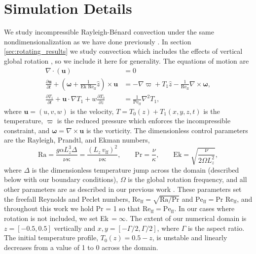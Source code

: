 \documentclass[aps, pre, onecolumn, nofootinbib, notitlepage, groupedaddress, amsfonts, amssymb, amsmath, longbibliography]{revtex4-1}
\newcommand{\Div}[1]{\ensuremath{\nabla\cdot\left( #1\right)}}
\newcommand{\grad}{\ensuremath{\nabla}}
\newcommand{\RB}{Rayleigh-B\'{e}nard }
\newcommand{\Reff}{\ensuremath{\text{Re}_{\text{ff}}}}
\newcommand{\Peff}{\ensuremath{\text{Pe}_{\text{ff}}}}
\begin{document}

\section{Simulation Details}
\label{sec:simulations}
We study incompressible \RB convection under the same nondimensionalization as we have done previously \cite{anders&all2018}.
In section \ref{sec:rotating_results} we study convection which includes the effects of vertical global rotation \cite{julien&all1996}, so we include it here for generality.
The equations of motion are
\begin{align}
\Div{\bm{u}} &= 0
	\label{eqn:incompressible}
\\
\frac{\partial \bm{u}}{\partial t} + \left(\bm{\omega} + \frac{1}{\text{Ek }\Reff}\hat{z}\right)\times\bm{u} 
&= - \grad \varpi + T_1\hat{z} - \frac{1}{\Reff}\grad\times\bm{\omega},
	\label{eqn:bouss_momentum}
\\
\frac{\partial T_1}{\partial t}  + \bm{u}\cdot\grad T_1 + w \frac{\partial T_0}{\partial z} 
&= \frac{1}{\Peff}\grad^2 T_1,
	\label{eqn:bouss_energy}
\end{align}
where $\bm{u} = (u, v, w)$ is the velocity, $T = T_0(z) + T_1(x, y, z, t)$ is the temperature, $\varpi$ is the reduced pressure which enforces the incompressible constraint, and $\bm{\omega} = \grad \times \bm{u}$ is the vorticity.
The dimensionless control parameters are the Rayleigh, Prandtl, and Ekman numbers,
\begin{equation}
\text{Ra} = \frac{g \alpha L_z^3 \Delta}{\nu\kappa} = \frac{(L_z\,v_{\text{ff}})^2}{\nu\kappa}, \qquad \text{Pr} = \frac{\nu}{\kappa}, \qquad \text{Ek} = \sqrt{\frac{\nu}{2\Omega L_z^2}},
\end{equation}
where $\Delta$ is the dimensionless temperature jump across the domain (described below with our boundary conditions), $\Omega$ is the global rotation frequency, and all other parameters are as described in our previous work \cite{anders&all2018}.
These parameters set the freefall Reynolds and Peclet numbers, $\Reff = \sqrt{\text{Ra}/\text{Pr}}$ and $\Peff = \text{Pr }\Reff$, and throughout this work we hold Pr = 1 so that $\Reff = \Peff$.
In our cases where rotation is not included, we set Ek$\,= \infty$.
The extent of our numerical domain is $z = [-0.5, 0.5]$ vertically and $x, y = [-\Gamma/2, \Gamma/2]$, where $\Gamma$ is the aspect ratio.
The initial temperature profile, $T_0(z) = 0.5 - z$, is unstable and linearly decreases from a value of 1 to 0 across the domain. 
\end{document}
